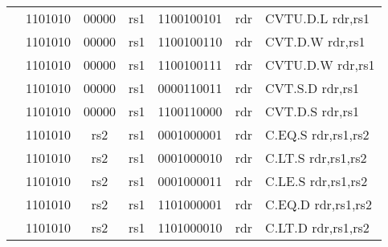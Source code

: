 \begin{table}[p]
\begin{small}
\begin{center}
\begin{tabular}{rcccccccccl}
&
\multicolumn{2}{|c|}{1101010} &
\multicolumn{1}{c|}{00000} &
\multicolumn{1}{c|}{rs1} &
\multicolumn{4}{c|}{1100100101} &
\multicolumn{1}{c|}{rdr} & CVTU.D.L rdr,rs1 \\
\cline{2-10}
  

&
\multicolumn{2}{|c|}{1101010} &
\multicolumn{1}{c|}{00000} &
\multicolumn{1}{c|}{rs1} &
\multicolumn{4}{c|}{1100100110} &
\multicolumn{1}{c|}{rdr} & CVT.D.W rdr,rs1 \\
\cline{2-10}
  

&
\multicolumn{2}{|c|}{1101010} &
\multicolumn{1}{c|}{00000} &
\multicolumn{1}{c|}{rs1} &
\multicolumn{4}{c|}{1100100111} &
\multicolumn{1}{c|}{rdr} & CVTU.D.W rdr,rs1 \\
\cline{2-10}
  

&
\multicolumn{2}{|c|}{1101010} &
\multicolumn{1}{c|}{00000} &
\multicolumn{1}{c|}{rs1} &
\multicolumn{4}{c|}{0000110011} &
\multicolumn{1}{c|}{rdr} & CVT.S.D rdr,rs1 \\
\cline{2-10}
  

&
\multicolumn{2}{|c|}{1101010} &
\multicolumn{1}{c|}{00000} &
\multicolumn{1}{c|}{rs1} &
\multicolumn{4}{c|}{1100110000} &
\multicolumn{1}{c|}{rdr} & CVT.D.S rdr,rs1 \\
\cline{2-10}
  

&
\multicolumn{2}{|c|}{1101010} &
\multicolumn{1}{c|}{rs2} &
\multicolumn{1}{c|}{rs1} &
\multicolumn{4}{c|}{0001000001} &
\multicolumn{1}{c|}{rdr} & C.EQ.S rdr,rs1,rs2 \\
\cline{2-10}
  

&
\multicolumn{2}{|c|}{1101010} &
\multicolumn{1}{c|}{rs2} &
\multicolumn{1}{c|}{rs1} &
\multicolumn{4}{c|}{0001000010} &
\multicolumn{1}{c|}{rdr} & C.LT.S rdr,rs1,rs2 \\
\cline{2-10}
  

&
\multicolumn{2}{|c|}{1101010} &
\multicolumn{1}{c|}{rs2} &
\multicolumn{1}{c|}{rs1} &
\multicolumn{4}{c|}{0001000011} &
\multicolumn{1}{c|}{rdr} & C.LE.S rdr,rs1,rs2 \\
\cline{2-10}
  

&
\multicolumn{2}{|c|}{1101010} &
\multicolumn{1}{c|}{rs2} &
\multicolumn{1}{c|}{rs1} &
\multicolumn{4}{c|}{1101000001} &
\multicolumn{1}{c|}{rdr} & C.EQ.D rdr,rs1,rs2 \\
\cline{2-10}
  

&
\multicolumn{2}{|c|}{1101010} &
\multicolumn{1}{c|}{rs2} &
\multicolumn{1}{c|}{rs1} &
\multicolumn{4}{c|}{1101000010} &
\multicolumn{1}{c|}{rdr} & C.LT.D rdr,rs1,rs2 \\
\cline{2-10}
  


\end{tabular}
\end{center}
\end{small}
\end{table}
